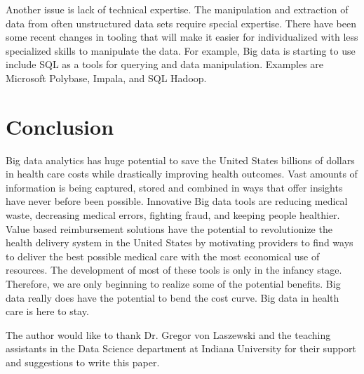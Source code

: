 \documentclass[sigconf]{acmart}
\begin{document}
Another issue is lack of technical expertise. The manipulation and extraction of data from often unstructured data sets require special expertise. There have been some recent changes in tooling that will make it easier for individualized with less specialized skills to manipulate the data. For example, Big data is starting to use include SQL as a tools for querying and data manipulation. Examples are Microsoft Polybase, Impala, and SQL Hadoop.  
 
 

\section{Conclusion}
Big data analytics has huge potential to save the United States billions of dollars in health care costs while drastically improving health outcomes.  Vast amounts of information is being captured, stored and combined in ways that offer insights have never before been possible.  Innovative Big data tools are reducing medical waste, decreasing medical errors, fighting fraud, and keeping people healthier. Value based reimbursement solutions have the potential to revolutionize the health delivery system in the United States by motivating providers to find ways to deliver the best possible medical care with the most economical use of resources.  The development of most of these tools is only in the infancy stage. Therefore, we are only beginning to realize some of the potential benefits. Big data really does have the potential to bend the cost curve. Big data in health care is here to stay.  







\begin{acks}

  The author would like to thank Dr. Gregor von Laszewski and the teaching assistants in the Data Science department at Indiana University for their support and suggestions to write this paper.

\end{acks}




 
\end{document}
